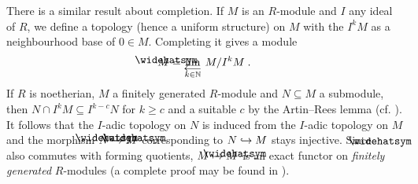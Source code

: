 \documentclass[a4paper,parskip=half,numbers=enddot, DIV=12]{scrreprt}
\renewcommand{\geq}{\geqslant}
\begin{document}
There is a similar result about completion. If $M$ is an $R$-module and $I$ any ideal of $R$, we define a topology (hence a uniform structure) on $M$ with the $I^kM$ as a neighbourhood base of $0\in M$. Completing it gives a module 
\begin{align*}
	\roof{M}=\limit[k\in\IN] M/I^kM\;. 
\end{align*}
If $R$ is noetherian, $M$ a finitely generated $R$-module and $N\subseteq M$ a submodule, then $N\cap I^kM\subseteq I^{k-c}N$ for $k\geq c$ and a suitable $c$ by the Artin--Rees lemma (cf. \cite[Proposition~3.4.1]{alg2}). It follows that the $I$-adic topology on $N$ is induced from the $I$-adic topology on $M$ and the morphism $\roof{N}\morphism\roof{M}$ corresponding to $N\monomorphism M$ stays injective. Since $\roof{\phantom{x}}$ also commutes with forming quotients, $M\mapsto\roof{M}$ is an exact functor on \emph{finitely generated} $R$-modules (a complete proof may be found in \cite[Lemma~7.15]{eisenbudCommAlg}). 
\end{document}

